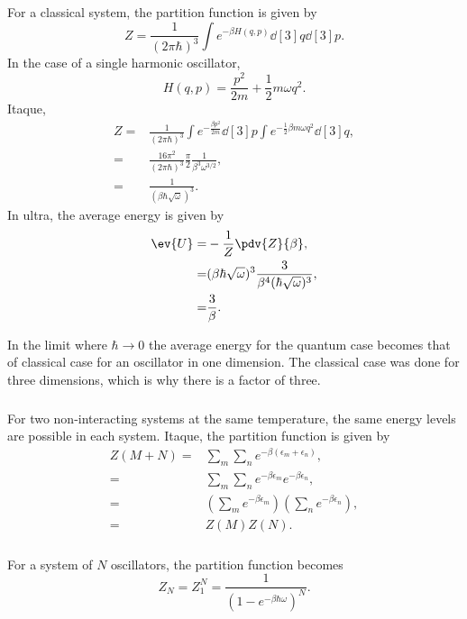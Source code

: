 \documentclass[a4paper,12pt,twoside]{article}
\begin{document}
\begin{multicols*}{2}
\subsubsection{}
For a classical system, the partition function is given by
\begin{equation}
	Z = \frac{1}{(2\pi\hbar)^3}\int e^{-\beta H(q,p)} \dd[3]{q}\dd[3]{p}.
\end{equation}
In the case of a single harmonic oscillator,
\begin{equation}
	H(q,p) = \frac{p^2}{2m} + \frac{1}{2}m\omega q^2.
\end{equation}
Itaque,
\begin{align}
	Z =& \frac{1}{(2\pi\hbar)^3}\int e^{-\frac{\beta p^2}{2m}}\dd[3]{p}\int e^{-\frac{1}{2}\beta m \omega q^2}\dd[3]{q},\\
	=& \frac{16\pi^2}{(2\pi\hbar)^3} \frac{\pi}{2} \frac{1}{\beta^3 \omega^{3/2}},\\
	=& \frac{1}{(\beta\hbar\sqrt{\omega})^{3}}.
\end{align}
In ultra, the average energy is given by
\begin{align}
	\ev{U} =& -\frac{1}{Z} \pdv{Z}{\beta},\\
	=& (\beta\hbar\sqrt{\omega})^{3}\frac{3}{\beta^4(\hbar\sqrt{\omega})^{3}},\\
	=& \frac{3}{\beta}.
\end{align}

In the limit where $\hbar \rightarrow 0$ the average energy for the quantum case becomes that of classical case for an oscillator in one dimension.
The classical case was done for three dimensions, which is why there is a factor of three.

\subsubsection{}
For two non-interacting systems at the same temperature, the same energy levels are possible in each system.
Itaque, the partition function is given by
\begin{align}
	Z(M+N) =& \sum_{m}\sum_{n} e^{-\beta (\epsilon_m+\epsilon_n)},\\
	=& \sum_{m}\sum_{n} e^{-\beta\epsilon_m}e^{-\beta\epsilon_n},\\
	=& \left(\sum_{m}e^{-\beta\epsilon_m}\right)\left(\sum_{n}e^{-\beta\epsilon_n}\right),\\
	=& Z(M)Z(N).
\end{align}

\subsubsection{}
For a system of $N$ oscillators, the partition function becomes
\begin{equation}
	Z_N = Z_1^N = \frac{1}{\left(1-e^{-\beta \hbar \omega}\right)^N}.
\end{equation}


\end{multicols*}
\end{document}
